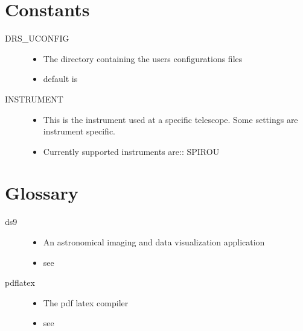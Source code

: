 \documentclass[a4paper,10pt,english]{report}
\begin{document}
\section{Constants}
\label{\detokenize{misc/glossary:constants}}\label{\detokenize{misc/glossary:glossary}}\label{\detokenize{misc/glossary::doc}}\begin{description}
\item[{DRS\_UCONFIG\label{\detokenize{misc/glossary:term-drs-uconfig}}}] \leavevmode\begin{itemize}
\item {} 
The directory containing the users configurations files

\item {} 
default is 

\end{itemize}

\item[{INSTRUMENT\label{\detokenize{misc/glossary:term-instrument}}}] \leavevmode\begin{itemize}
\item {} 
This is the instrument used at a specific telescope. Some settings are instrument specific.

\item {} 
Currently supported instruments are::
SPIROU

\end{itemize}

\end{description}


\section{Glossary}
\label{\detokenize{misc/glossary:id1}}\begin{description}
\item[{ds9\label{\detokenize{misc/glossary:term-ds9}}}] \leavevmode\begin{itemize}
\item {} 
An astronomical imaging and data visualization application

\item {} 
see 

\end{itemize}

\item[{pdflatex\label{\detokenize{misc/glossary:term-pdflatex}}}] \leavevmode\begin{itemize}
\item {} 
The pdf latex compiler

\item {} 
see 

\end{itemize}

\end{description}
\end{document}
